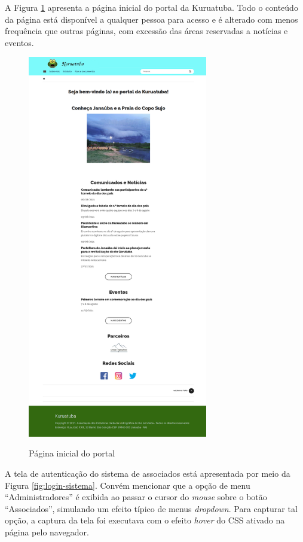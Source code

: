 A Figura \ref{fig:home-portal} apresenta a página inicial do portal da Kuruatuba. Todo o conteúdo da página está disponível a qualquer pessoa para acesso e é alterado com menos frequência que outras páginas, com excessão das áreas reservadas a notícias e eventos.

\clearpage
\newpage

\begin{figure}[htb]
 \centering
 \caption{Página inicial do portal}
 \includegraphics[width=0.7\textwidth]{figuras/kuruatuba_portal_home.png}
 \label{fig:home-portal}
\end{figure}

\newpage
\clearpage

A tela de autenticação do sistema de associados está apresentada por meio da Figura \ref{fig:login-sistema}. Convém mencionar que a opção de menu ``Administradores'' é exibida ao passar o cursor do \textit{mouse} sobre o botão ``Associados'', simulando um efeito típico de menus \textit{dropdown}. Para capturar tal opção, a captura da tela foi executava com o efeito \textit{hover} do CSS ativado na página pelo navegador. 



